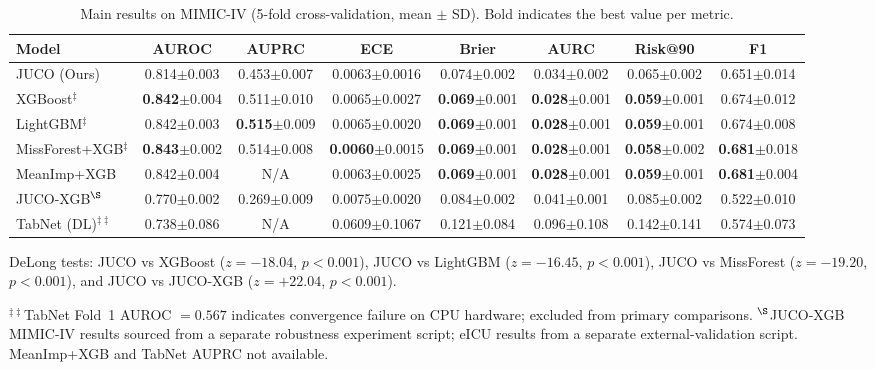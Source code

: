 \documentclass[journal]{IEEEtran}
\begin{document}
	\begin{table}[htbp]
		\centering
		\caption{Main results on MIMIC-IV (5-fold cross-validation, mean $\pm$ SD). Bold indicates the best value per metric.}
		\label{tab:main_results}
		\small
		\begin{tabular}{lccccccc}
			\toprule
			Model & AUROC & AUPRC & ECE & Brier & AURC & Risk@90 & F1\\
			\midrule
			JUCO (Ours)&0.814$\pm$0.003&0.453$\pm$0.007&0.0063$\pm$0.0016&0.074$\pm$0.002&0.034$\pm$0.002&0.065$\pm$0.002&0.651$\pm$0.014\\
			XGBoost$^\ddagger$&\textbf{0.842}$\pm$0.004&0.511$\pm$0.010&0.0065$\pm$0.0027&\textbf{0.069}$\pm$0.001&\textbf{0.028}$\pm$0.001&\textbf{0.059}$\pm$0.001&0.674$\pm$0.012\\
			LightGBM$^\ddagger$&0.842$\pm$0.003&\textbf{0.515}$\pm$0.009&0.0065$\pm$0.0020&\textbf{0.069}$\pm$0.001&\textbf{0.028}$\pm$0.001&\textbf{0.059}$\pm$0.001&0.674$\pm$0.008\\
			MissForest+XGB$^\ddagger$&\textbf{0.843}$\pm$0.002&0.514$\pm$0.008&\textbf{0.0060}$\pm$0.0015&\textbf{0.069}$\pm$0.001&\textbf{0.028}$\pm$0.001&\textbf{0.058}$\pm$0.002&\textbf{0.681}$\pm$0.018\\
			MeanImp+XGB&0.842$\pm$0.004&N/A&0.0063$\pm$0.0025&\textbf{0.069}$\pm$0.001&\textbf{0.028}$\pm$0.001&\textbf{0.059}$\pm$0.001&\textbf{0.681}$\pm$0.004\\
			JUCO-XGB$^\S$&0.770$\pm$0.002&0.269$\pm$0.009&0.0075$\pm$0.0020&0.084$\pm$0.002&0.041$\pm$0.001&0.085$\pm$0.002&0.522$\pm$0.010\\
			TabNet (DL)$^{\ddagger\ddagger}$&0.738$\pm$0.086&N/A&0.0609$\pm$0.1067&0.121$\pm$0.084&0.096$\pm$0.108&0.142$\pm$0.141&0.574$\pm$0.073\\
			\bottomrule
		\end{tabular}
		
		\smallskip
		\raggedright\footnotesize
		DeLong tests: JUCO vs XGBoost ($z=-18.04$, $p<0.001$), JUCO vs LightGBM ($z=-16.45$, $p<0.001$), JUCO vs MissForest ($z=-19.20$, $p<0.001$), and JUCO vs JUCO-XGB ($z=+22.04$, $p<0.001$).
		
		\smallskip
		$^{\ddagger\ddagger}$TabNet Fold~1 AUROC $=0.567$ indicates convergence failure on CPU hardware; excluded from primary comparisons. $^{\S}$JUCO-XGB MIMIC-IV results sourced from a separate robustness experiment script; eICU results from a separate external-validation script. MeanImp+XGB and TabNet AUPRC not available.
	\end{table}
	
\end{document}

